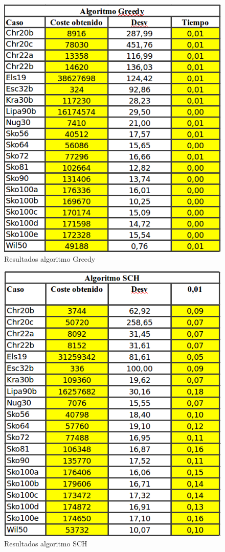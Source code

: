 \begin{figure}[H]
\centering
\includegraphics[scale=.60]{greedy.png}
\caption{Resultados algoritmo Greedy}
\label{}
\end{figure}


\begin{figure}[H]
\centering
\includegraphics[scale=.60]{sch.png}
\caption{Resultados algoritmo SCH}
\label{}
\end{figure}


